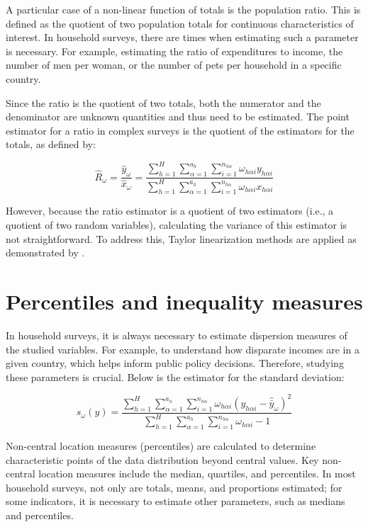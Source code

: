 \documentclass[
  12pt,
]{book}
\begin{document}
A particular case of a non-linear function of totals is the population ratio. This is defined as the quotient of two population totals for continuous characteristics of interest. In household surveys, there are times when estimating such a parameter is necessary. For example, estimating the ratio of expenditures to income, the number of men per woman, or the number of pets per household in a specific country.

Since the ratio is the quotient of two totals, both the numerator and the denominator are unknown quantities and thus need to be estimated. The point estimator for a ratio in complex surveys is the quotient of the estimators for the totals, as defined by:

\[
\hat{R}_{\omega} = \frac{\hat{y}_{\omega}}{\hat{x}_{\omega}}
= \frac{\sum_{h=1}^{H}\sum_{\alpha=1}^{a_{h}}\sum_{i=1}^{n_{h\alpha}}\omega_{h\alpha i}y_{h\alpha i}}{\sum_{h=1}^{H}\sum_{\alpha=1}^{a_{h}}\sum_{i=1}^{n_{h\alpha}}\omega_{h\alpha i}x_{h\alpha i}}
\]

However, because the ratio estimator is a quotient of two estimators (i.e., a quotient of two random variables), calculating the variance of this estimator is not straightforward. To address this, Taylor linearization methods are applied as demonstrated by \citet{Gutierrez_2016}.

\section{Percentiles and inequality measures}\label{percentiles-and-inequality-measures}

In household surveys, it is always necessary to estimate dispersion measures of the studied variables. For example, to understand how disparate incomes are in a given country, which helps inform public policy decisions. Therefore, studying these parameters is crucial. Below is the estimator for the standard deviation:

\[
s_{\omega}\left(y\right) = \frac{\sum_{h=1}^{H}\sum_{\alpha=1}^{a_{h}}\sum_{i=1}^{n_{h\alpha}}\omega_{h\alpha i}\left(y_{h\alpha i}-\hat{\bar{y}}_{\omega}\right)^{2}}{\sum_{h=1}^{H}\sum_{\alpha=1}^{a_{h}}\sum_{i=1}^{n_{h\alpha}}\omega_{h\alpha i}-1}
\]

Non-central location measures (percentiles) are calculated to determine characteristic points of the data distribution beyond central values. Key non-central location measures include the median, quartiles, and percentiles. In most household surveys, not only are totals, means, and proportions estimated; for some indicators, it is necessary to estimate other parameters, such as medians and percentiles.
\end{document}
